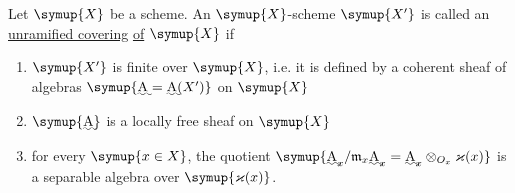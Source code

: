 Let $\symup{X}$ be a scheme. An $\symup{X}$-scheme $\symup{X'}$ is called an \uline{unramified covering}
\uline{of} $\symup{X}$ if
\begin{enumerate}
  \item[\textnormal{i.}] $\symup{X'}$ is finite over $\symup{X}$, i.e. it is defined by a coherent
    sheaf of algebras $\symup{\text{\uwave{A}}=\text{\uwave{A}}(X')}$ on $\symup{X}$
  \item[\textnormal{ii.}] $\symup{\text{\uwave{A}}}$ is a locally free sheaf on $\symup{X}$
  \item[\textnormal{iii.}] for every $\symup{x\in X}$, the quotient
    $\symup{\text{\uwave{A}}_x/\mathfrak m_x\text{\uwave{A}}_x =\text{\uwave{A}}_x\otimes_{O_x}\varkappa(x)}$
    is a separable algebra over $\symup{\varkappa(x)}$.
\end{enumerate}


